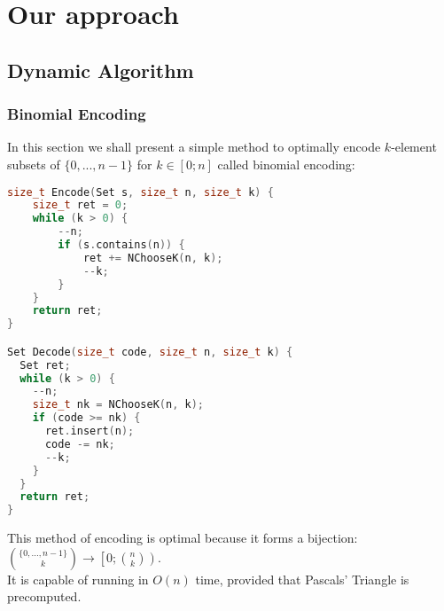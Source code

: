 \section{Our approach}
\subsection{Dynamic Algorithm}
\subsubsection{Binomial Encoding \cite{binomial_encoding}}
In this section we shall present a simple method to optimally encode $k$-element subsets of $\{0,...,n-1\}$ for $k\in\left[0;n\right]$ called binomial encoding:
\begin{lstlisting}[language=C++]
size_t Encode(Set s, size_t n, size_t k) {
	size_t ret = 0;
	while (k > 0) {
		--n;
		if (s.contains(n)) {
			ret += NChooseK(n, k);
			--k;
		}
	}
	return ret;
}

Set Decode(size_t code, size_t n, size_t k) {
  Set ret;
  while (k > 0) {
    --n;
    size_t nk = NChooseK(n, k);
    if (code >= nk) {
      ret.insert(n);
      code -= nk;
      --k;
    }
  }
  return ret;
}
\end{lstlisting}
This method of encoding is optimal because it forms a bijection: $\binom{\{0,...,n-1\}}{k}\rightarrow\left[0; \binom{n}{k}\right)$.\\
It is capable of running in $O(n)$ time, provided that Pascals' Triangle is precomputed.
